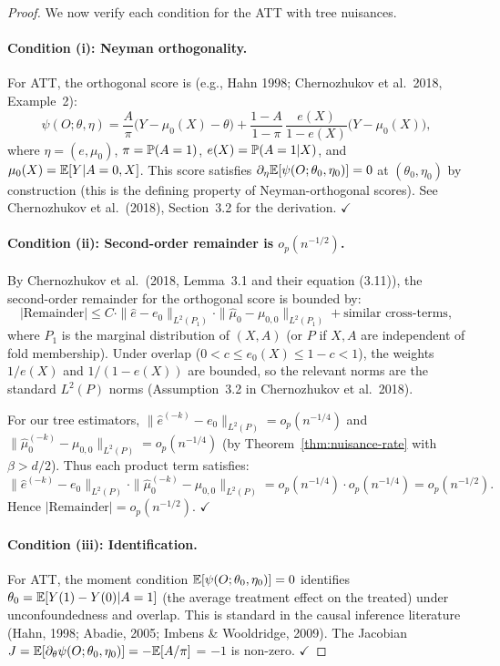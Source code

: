 \documentclass[12pt]{article}
\begin{document}
\begin{proof}
We now verify each condition for the ATT with tree nuisances.

\paragraph{Condition (i): Neyman orthogonality.}
For ATT, the orthogonal score is (e.g., Hahn 1998; Chernozhukov et al.\ 2018, Example~2):
\[
\psi(O; \theta, \eta) = \frac{A}{\pi}\bigl( Y - \mu_0(X) - \theta \bigr) + \frac{1-A}{1-\pi} \, \frac{e(X)}{1 - e(X)} \bigl( Y - \mu_0(X) \bigr),
\]
where $\eta = (e, \mu_0)$, $\pi = \mathbb{P}(A=1)$, $e(X) = \mathbb{P}(A=1|X)$, and $\mu_0(X) = \mathbb{E}[Y|A=0,X]$. This score satisfies $\partial_\eta \mathbb{E}[\psi(O; \theta_0, \eta_0)] = 0$ at $(\theta_0, \eta_0)$ by construction (this is the defining property of Neyman-orthogonal scores). See Chernozhukov et al.\ (2018), Section~3.2 for the derivation. $\checkmark$

\paragraph{Condition (ii): Second-order remainder is $o_p(n^{-1/2})$.}
By Chernozhukov et al.\ (2018, Lemma~3.1 and their equation (3.11)), the second-order remainder for the orthogonal score is bounded by:
\[
|\text{Remainder}| \le C \cdot \|\hat{e} - e_0\|_{L^2(P_1)} \cdot \|\hat{\mu}_0 - \mu_{0,0}\|_{L^2(P_1)} + \text{similar cross-terms},
\]
where $P_1$ is the marginal distribution of $(X, A)$ (or $P$ if $X, A$ are independent of fold membership). Under overlap ($0 < c \le e_0(X) \le 1-c < 1$), the weights $1/e(X)$ and $1/(1-e(X))$ are bounded, so the relevant norms are the standard $L^2(P)$ norms (Assumption~3.2 in Chernozhukov et al.\ 2018).

For our tree estimators, $\|\hat{e}^{(-k)} - e_0\|_{L^2(P)} = o_p(n^{-1/4})$ and $\|\hat{\mu}_0^{(-k)} - \mu_{0,0}\|_{L^2(P)} = o_p(n^{-1/4})$ (by Theorem~\ref{thm:nuisance-rate} with $\beta > d/2$). Thus each product term satisfies:
\[
\|\hat{e}^{(-k)} - e_0\|_{L^2(P)} \cdot \|\hat{\mu}_0^{(-k)} - \mu_{0,0}\|_{L^2(P)} = o_p(n^{-1/4}) \cdot o_p(n^{-1/4}) = o_p(n^{-1/2}).
\]
Hence $|\text{Remainder}| = o_p(n^{-1/2})$. $\checkmark$

\paragraph{Condition (iii): Identification.}
For ATT, the moment condition $\mathbb{E}[\psi(O; \theta_0, \eta_0)] = 0$ identifies $\theta_0 = \mathbb{E}[Y(1) - Y(0) | A = 1]$ (the average treatment effect on the treated) under unconfoundedness and overlap. This is standard in the causal inference literature (Hahn, 1998; Abadie, 2005; Imbens \& Wooldridge, 2009). The Jacobian $J = \mathbb{E}[\partial_\theta \psi(O; \theta_0, \eta_0)] = -\mathbb{E}[A/\pi]$ = $-1$ is non-zero. $\checkmark$


\end{proof}
\end{document}
